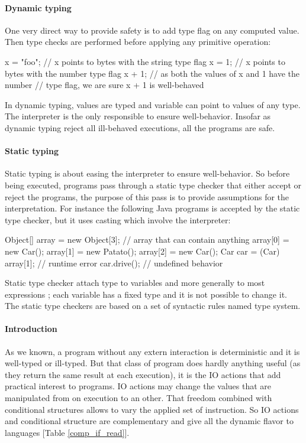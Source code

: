 \documentclass[a4paper]{report}
\newcommand{\reftab}[1]{[Table \ref{#1}]}
\begin{document}
\paragraph{Dynamic typing} One very direct way to provide safety is to add type flag on any computed value. Then type checks are performed before applying any primitive operation:
\begin{code}
x = "foo"; // x points to bytes with the string type flag
x = 1;     // x points to bytes with the number type flag
x + 1;     // as both the values of x and 1 have the number
           // type flag, we are sure x + 1 is well-behaved
\end{code}
In dynamic typing, values are typed and variable can point to values of any type. The interpreter is the only responsible to ensure well-behavior. Insofar as dynamic typing reject all ill-behaved executions, all the programs are safe.

\paragraph{Static typing} Static typing is about easing the interpreter to ensure well-behavior. So before being executed, programs pass through a static type checker that either accept or reject the programs, the purpose of this pass is to provide assumptions for the interpretation. For instance the following Java programs is accepted by the static type checker, but it uses casting which involve the interpreter:
\begin{java}
Object[] array = new Object[3]; // array that can contain anything
array[0] = new Car();
array[1] = new Patato();
array[2] = new Car();
Car car = (Car) array[1];       // runtime error
car.drive();                    // undefined behavior
\end{java}
Static type checker attach type to variables and more generally to most expressions ; each variable has a fixed type and it is not possible to change it. The static type checkers are based on a set of syntactic rules named type system.





\paragraph{Introduction} As we known, a program without any extern interaction is deterministic and it is well-typed or ill-typed. But that class of program does hardly anything useful (as they return the same result at each execution), it is the IO actions that add practical interest to programs. IO actions may change the values that are manipulated from on execution to an other. That freedom combined with conditional structures allows to vary the applied set of instruction. So IO actions and conditional structure are complementary and give all the dynamic flavor to languages \reftab{comp_if_read}.
\end{document}
